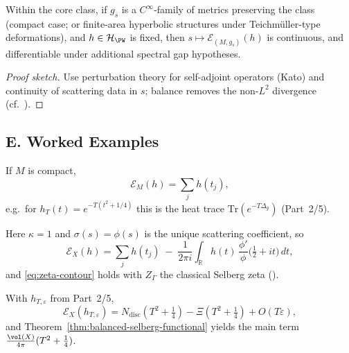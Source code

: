 \begin{theorem}
\label{thm:stability}
Within the core class, if $g_s$ is a $C^\infty$-family of metrics preserving the class (compact case; or finite-area hyperbolic structures under Teichmüller-type deformations), and $h\in\mathcal H_{\PW}$ is fixed, then $s\mapsto \mathcal E_{(M,g_s)}(h)$ is continuous, and differentiable under additional spectral gap hypotheses.
\end{theorem}

\begin{proof}[Proof sketch]
Use perturbation theory for self-adjoint operators (Kato) and continuity of scattering data in $s$; balance removes the non-$L^2$ divergence (cf.\ \cite{Iwaniec2002}).
\end{proof}


\subsection*{E. Worked Examples}
\label{subsec:examples}

\begin{example}
If $M$ is compact,
\[
  \mathcal E_M(h)=\sum_{j} h(t_j),
\]
e.g.\ for $h_T(t)=e^{-T(t^2+1/4)}$ this is the heat trace $\mathrm{Tr}(e^{-T\Delta_g})$ (Part~2/5).
\end{example}

\begin{example}[Modular surface $X=\mathrm{PSL}_2(\mathbb Z)\backslash\mathbb H$]
Here $\kappa=1$ and $\sigma(s)=\phi(s)$ is the unique scattering coefficient, so
\[
  \mathcal E_X(h)=\sum_j h(t_j) \;-\; \frac{1}{2\pi i}\int_{\mathbb R} h(t)\,\frac{\phi'}{\phi}\!\Big(\tfrac12+it\Big)\,dt,
\]
and \eqref{eq:zeta-contour} holds with $Z_\Gamma$ the classical Selberg zeta (\cite{Hejhal1983}).
\end{example}

\begin{example}
With $h_{T,\varepsilon}$ from Part~2/5,
\[
  \mathcal E_X(h_{T,\varepsilon})=N_{\mathrm{disc}}(T^2+\tfrac14) - \Xi(T^2+\tfrac14) + O(T\varepsilon),
\]
and Theorem~\ref{thm:balanced-selberg-functional} yields the main term $\frac{\vol(X)}{4\pi}(T^2+\frac14)$.
\end{example}


